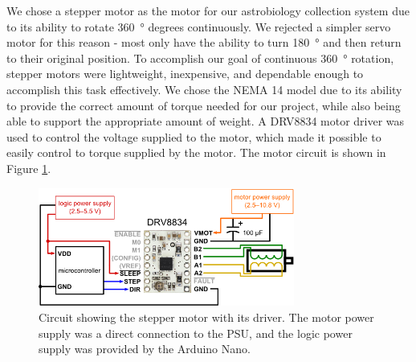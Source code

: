 We chose a stepper motor as the motor for our astrobiology collection system due to its ability to rotate \SI{360}{\degree} degrees continuously.
We rejected a simpler servo motor for this reason - most only have the ability to turn \SI{180}{\degree} and then return to their original position.
To accomplish our goal of continuous \SI{360}{\degree} rotation, stepper motors were lightweight, inexpensive, and dependable enough to accomplish this task effectively.
We chose the NEMA 14 model due to its ability to provide the correct amount of torque needed for our project, while also being able to support the appropriate amount of weight.
A DRV8834 motor driver was used to control the voltage supplied to the motor, which made it possible to easily control to torque supplied by the motor.
The motor circuit is shown in Figure \ref{fig:motor-circuit}.

\begin{figure}[h!]
	\begin{center}
		\includegraphics[width=0.75\textwidth]{figures/stepper-motor-circuit.png}
		\caption{Circuit showing the stepper motor with its driver. The motor power supply was a direct connection to the PSU, and the logic power supply was provided by the Arduino Nano.}
		\label{fig:motor-circuit}
	\end{center}
\end{figure}
